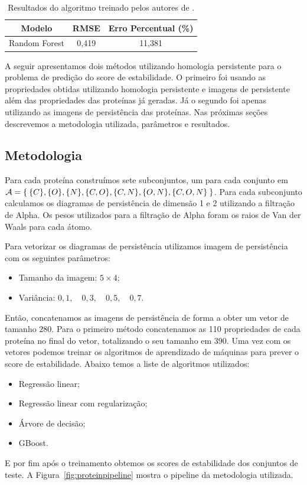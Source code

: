 \begin{table}[!htpb]
    \centering
    \caption{Resultados do algoritmo treinado pelos autores de \cite{Rocklin2017}.}
    \label{tab:rockl_result}
    \begin{tabular}{@{}ccc@{}}
    \toprule
    Modelo        & RMSE  & Erro Percentual (\%) \\ \midrule
    Random Forest & 0,419 & 11,381               \\ \bottomrule
    \end{tabular}
\end{table} 

A seguir apresentamos dois métodos utilizando homologia persistente para o problema de predição
do score de estabilidade. O primeiro foi usando as propriedades obtidas utilizando
homologia persistente e imagens de persistente além das propriedades das proteínas já geradas. 
Já o segundo foi apenas utilizando as imagens de persistência das proteínas. Nas próximas
seções descrevemos a metodologia utilizada, parâmetros e resultados.

\subsection{Metodologia}
Para cada proteína construímos sete subconjuntos, um para cada conjunto em $\mathcal{A} = \Set{\{C\}, \{O\}, \{N\}, 
\{C, O\}, \{C, N\}, \{O,N\}, \{C,O,N\}}$. Para cada subconjunto calculamos os diagramas de persistência
de dimensão 1 e 2 utilizando a filtração de Alpha. Os pesos utilizados para a filtração de Alpha foram os raios
de Van der Waals para cada átomo. 

Para vetorizar os diagramas de persistência utilizamos imagem de persistência com os seguintes parâmetros:
\begin{itemize}
    \item Tamanho da imagem: $5 \times 4$;
    \item Variância: $0,1,\quad 0,3,\quad 0,5,\quad 0,7$. 
\end{itemize}

Então, concatenamos as imagens de persistência de forma a obter um vetor de tamanho $280$. Para o
primeiro método concatenamos as 110 propriedades de cada proteína no final do vetor, totalizando 
o seu tamanho em $390$. Uma vez com os vetores podemos treinar os algoritmos de aprendizado de máquinas
para prever o score de estabilidade. Abaixo temos a liste de algoritmos utilizados:
\begin{itemize}
    \item Regressão linear;
    \item Regressão linear com regularização; 
    \item Árvore de decisão;
    \item GBoost. 
\end{itemize}
E por fim após o treinamento obtemos os scores de estabilidade dos conjuntos de teste. 
A Figura~\ref{fig:proteinpipeline} mostra o pipeline da metodologia utilizada. 

